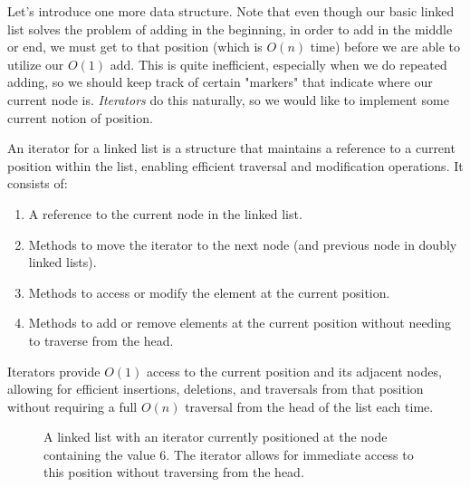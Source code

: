   Let's introduce one more data structure. Note that even though our basic linked list solves the problem of adding in the beginning, in order to add in the middle or end, we must get to that position (which is $O(n)$ time) before we are able to utilize our $O(1)$ add. This is quite inefficient, especially when we do repeated adding, so we should keep track of certain "markers" that indicate where our current node is. \textit{Iterators} do this naturally, so we would like to implement some current notion of position. 

  \begin{definition}
    An iterator for a linked list is a structure that maintains a reference to a current position within the list, enabling efficient traversal and modification operations. It consists of:
    \begin{enumerate}
      \item A reference to the current node in the linked list.
      \item Methods to move the iterator to the next node (and previous node in doubly linked lists).
      \item Methods to access or modify the element at the current position.
      \item Methods to add or remove elements at the current position without needing to traverse from the head.
    \end{enumerate}
    Iterators provide $O(1)$ access to the current position and its adjacent nodes, allowing for efficient insertions, deletions, and traversals from that position without requiring a full $O(n)$ traversal from the head of the list each time.
    \begin{figure}[H]
      \centering 
      \caption{A linked list with an iterator currently positioned at the node containing the value 6. The iterator allows for immediate access to this position without traversing from the head.}
      \label{fig:linked_list_iterator}
    \end{figure}
  \end{definition}

